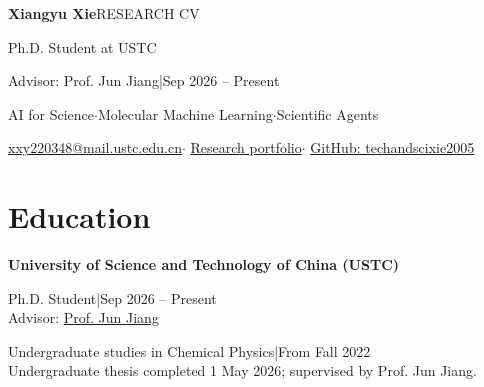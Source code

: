 \documentclass[11pt,a4paper]{article}
\begin{document}
{\fontsize{29}{32}\selectfont\bfseries Xiangyu Xie}\hfill {\small RESEARCH CV}\par
{\large Ph.D. Student at USTC}\par
Advisor: Prof. Jun Jiang\enspace |\enspace Sep 2026 -- Present\par
{\small AI for Science\enspace $\cdot$\enspace Molecular Machine Learning\enspace $\cdot$\enspace Scientific Agents}\par
{\small\href{mailto:xxy220348@mail.ustc.edu.cn}{xxy220348@mail.ustc.edu.cn}\enspace $\cdot$\enspace
\href{https://techandscixie2005.github.io/portfolio/}{Research portfolio}\enspace $\cdot$\enspace
\href{https://github.com/techandscixie2005}{GitHub: techandscixie2005}}

\section{Education}
\textbf{University of Science and Technology of China (USTC)}\par
Ph.D. Student\enspace |\enspace Sep 2026 -- Present\\
Advisor: \href{https://faculty.ustc.edu.cn/jiangjun1/en/}{Prof. Jun Jiang}\par
Undergraduate studies in Chemical Physics\enspace |\enspace From Fall 2022\\
{\small Undergraduate thesis completed 1 May 2026; supervised by Prof. Jun Jiang.}
\end{document}
